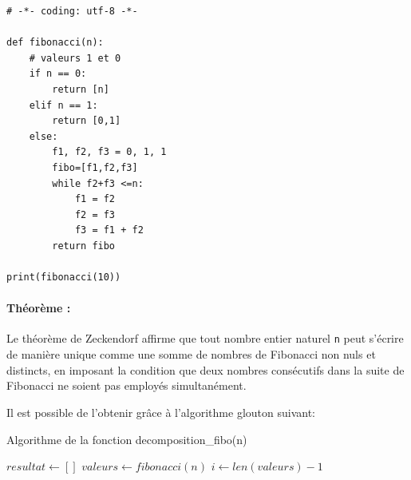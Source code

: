 
\begin{verbatim}
# -*- coding: utf-8 -*-

def fibonacci(n):
    # valeurs 1 et 0
    if n == 0:
        return [n]        
    elif n == 1:
        return [0,1]
    else:
        f1, f2, f3 = 0, 1, 1
        fibo=[f1,f2,f3]
        while f2+f3 <=n:
            f1 = f2
            f2 = f3
            f3 = f1 + f2
        return fibo

print(fibonacci(10))
\end{verbatim}

\paragraph{Théorème :} Le théorème de Zeckendorf affirme que tout nombre entier naturel \verb?n? peut s'écrire de manière unique comme une somme de nombres de Fibonacci non nuls et distincts, en imposant la condition que deux nombres consécutifs dans la suite de Fibonacci ne soient pas employés simultanément. 

Il est possible de l'obtenir grâce à l'algorithme glouton suivant:
\begin{algorithm}
\caption{Algorithme de la fonction decomposition\_fibo(n)}\label{alg:two}
$resultat \gets []$\;
$valeurs \gets fibonacci(n)$\;
$i \gets len(valeurs)-1$\;
\end{algorithm}



